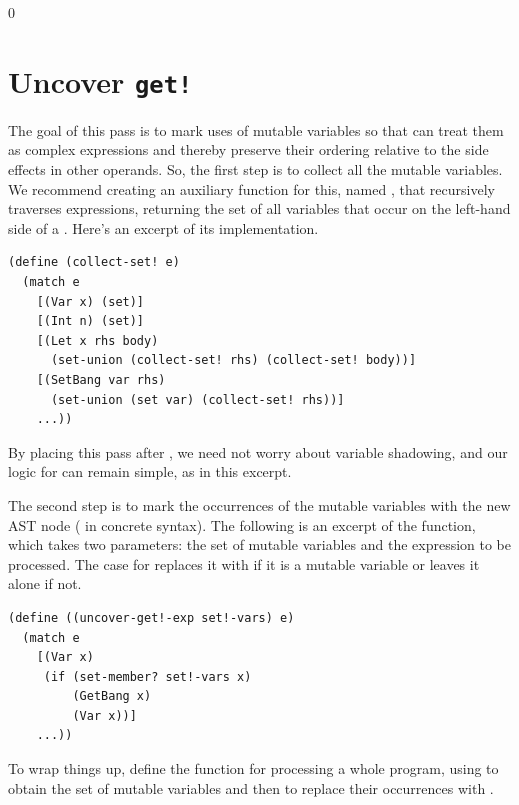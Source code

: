 \documentclass[7x10]{TimesAPriori_MIT}%
\def\racketEd{0}
\providecommand{\BookEdition}{1}
\let\edition\BookEdition
\numberwithin{theorem}{chapter}
\numberwithin{definition}{chapter}
\numberwithin{equation}{chapter}
\begin{document}
{\if\edition\racketEd
\section{Uncover \texttt{get!}}
\label{sec:uncover-get-bang}

The goal of this pass is to mark uses of mutable variables so that
 can treat them as complex expressions
and thereby preserve their ordering relative to the side effects in
other operands. So, the first step is to collect all the mutable
variables. We recommend creating an auxiliary function for this,
named , that recursively traverses expressions,
returning the set of all variables that occur on the left-hand side of a
. Here's an excerpt of its implementation.
\begin{center}
\begin{minipage}{\textwidth}
\begin{lstlisting}
(define (collect-set! e)
  (match e
    [(Var x) (set)]
    [(Int n) (set)]
    [(Let x rhs body)
      (set-union (collect-set! rhs) (collect-set! body))]
    [(SetBang var rhs)
      (set-union (set var) (collect-set! rhs))]
    ...))
\end{lstlisting}
\end{minipage}
\end{center}
By placing this pass after , we need not worry about
variable shadowing, and our logic for  can remain simple, as
in this excerpt.

The second step is to mark the occurrences of the mutable variables
with the new  AST node ( in concrete
syntax). The following is an excerpt of the 
function, which takes two parameters: the set of mutable variables
 and the expression  to be processed. The
case for  replaces it with  if it is a
mutable variable or leaves it alone if not.
\begin{center}
\begin{minipage}{\textwidth}
\begin{lstlisting}
(define ((uncover-get!-exp set!-vars) e)
  (match e
    [(Var x)
     (if (set-member? set!-vars x)
         (GetBang x)
         (Var x))]
    ...))
\end{lstlisting}
\end{minipage}
\end{center}

To wrap things up, define the  function for
processing a whole program, using  to obtain the
set of mutable variables and then  to replace
their occurrences with .


\fi}
\end{document}
